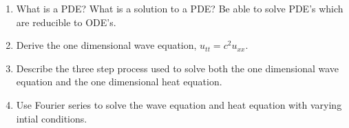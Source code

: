 
\begin{enumerate}

\item What is a PDE? What is a solution to a PDE? Be able to solve PDE's which are reducible to ODE's.
\item Derive the one dimensional wave equation, $u_{tt} = c^2 u_{xx}$.
\item Describe the three step process used to solve both the one dimensional wave equation and the one dimensional heat equation.
\item Use Fourier series to solve the wave equation and heat equation with varying intial conditions.
\end{enumerate}

